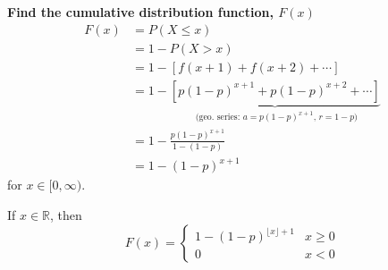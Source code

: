 \textbf{Find the cumulative distribution function, $ F(x)$}
\begin{align*}
    F(x) & =P(X\le x)                                         \\
         & =1-P(X>x)                                          \\
         & =1-\left[f(x+1)+f(x+2)+\cdots\right]                                  \\
         & =1-\underbrace{\left[p(1-p)^{x+1}+p(1-p)^{x+2}+\cdots\right]}_
    \text{ (geo. series: $a=p(1-p)^{x+1}$, $r=1-p$)}          \\
         & =1-\frac{p(1-p)^{x+1}}{1-(1-p)}                    \\
         & =1-(1-p)^{x+1}
\end{align*}
for $ x\in[0,\infty) $.

If $ x\in\mathbb{R} $, then
\[ F(x)=
    \left\{\begin{array}{cc}
        1-(1-p)^{\lfloor x \rfloor +1}& x\ge 0 \\
        0& x < 0
    \end{array}\right.
\]
